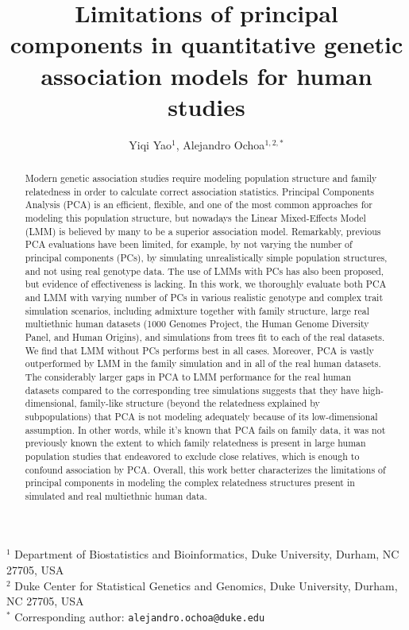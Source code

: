 \documentclass[11pt]{article}
\title{\Large \textbf{
    Limitations of principal components in quantitative genetic association models for human studies
  }}
\author{Yiqi Yao$^1$, Alejandro Ochoa$^{1,2,*}$}
\date{}
\begin{document}
\maketitle

\noindent
$^1$ Department of Biostatistics and Bioinformatics, Duke University, Durham, NC 27705, USA \\
$^2$ Duke Center for Statistical Genetics and Genomics, Duke University, Durham, NC 27705, USA \\
$^*$ Corresponding author: \texttt{alejandro.ochoa@duke.edu}

\begin{abstract}
  Modern genetic association studies require modeling population structure and family relatedness in order to calculate correct association statistics.
  Principal Components Analysis (PCA) is an efficient, flexible, and one of the most common approaches for modeling this population structure, but nowadays the Linear Mixed-Effects Model (LMM) is believed by many to be a superior association model.
  Remarkably, previous PCA evaluations have been limited, for example, by not varying the number of principal components (PCs), by simulating unrealistically simple population structures, and not using real genotype data.
  The use of LMMs with PCs has also been proposed, but evidence of effectiveness is lacking.
  In this work, we thoroughly evaluate both PCA and LMM with varying number of PCs in various realistic genotype and complex trait simulation scenarios, including admixture together with family structure, large real multiethnic human datasets (1000 Genomes Project, the Human Genome Diversity Panel, and Human Origins), and simulations from trees fit to each of the real datasets.
  We find that LMM without PCs performs best in all cases.
  Moreover, PCA is vastly outperformed by LMM in the family simulation and in all of the real human datasets.
  The considerably larger gaps in PCA to LMM performance for the real human datasets compared to the corresponding tree simulations suggests that they have high-dimensional, family-like structure (beyond the relatedness explained by subpopulations) that PCA is not modeling adequately because of its low-dimensional assumption.
  In other words, while it's known that PCA fails on family data, it was not previously known the extent to which family relatedness is present in large human population studies that endeavored to exclude close relatives, which is enough to confound association by PCA.
  Overall, this work better characterizes the limitations of principal components in modeling the complex relatedness structures present in simulated and real multiethnic human data.

\end{abstract}
\end{document}
